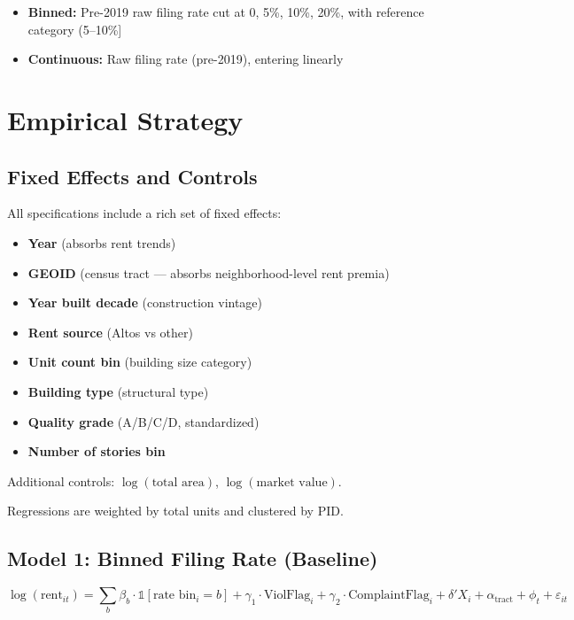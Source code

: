 \documentclass[
  11pt,
]{article}
\providecommand{\tightlist}{%
  \setlength{\itemsep}{0pt}\setlength{\parskip}{0pt}}
\begin{document}
\begin{itemize}
\tightlist
\item
  \textbf{Binned:} Pre-2019 raw filing rate cut at 0, 5\%, 10\%, 20\%,
  with reference category (5--10\%{]}
\item
  \textbf{Continuous:} Raw filing rate (pre-2019), entering linearly
\end{itemize}

\section{Empirical Strategy}\label{empirical-strategy}

\subsection{Fixed Effects and
Controls}\label{fixed-effects-and-controls}

All specifications include a rich set of fixed effects:

\begin{itemize}
\tightlist
\item
  \textbf{Year} (absorbs rent trends)
\item
  \textbf{GEOID} (census tract --- absorbs neighborhood-level rent
  premia)
\item
  \textbf{Year built decade} (construction vintage)
\item
  \textbf{Rent source} (Altos vs other)
\item
  \textbf{Unit count bin} (building size category)
\item
  \textbf{Building type} (structural type)
\item
  \textbf{Quality grade} (A/B/C/D, standardized)
\item
  \textbf{Number of stories bin}
\end{itemize}

Additional controls: \(\log(\text{total area})\),
\(\log(\text{market value})\).

Regressions are weighted by total units and clustered by PID.

\subsection{Model 1: Binned Filing Rate
(Baseline)}\label{model-1-binned-filing-rate-baseline}

\[
\log(\text{rent}_{it}) = \sum_{b} \beta_b \cdot \mathbb{1}[\text{rate bin}_i = b] + \gamma_1 \cdot \text{ViolFlag}_i + \gamma_2 \cdot \text{ComplaintFlag}_i + \delta' X_i + \alpha_{\text{tract}} + \phi_t + \varepsilon_{it}
\]
\end{document}
